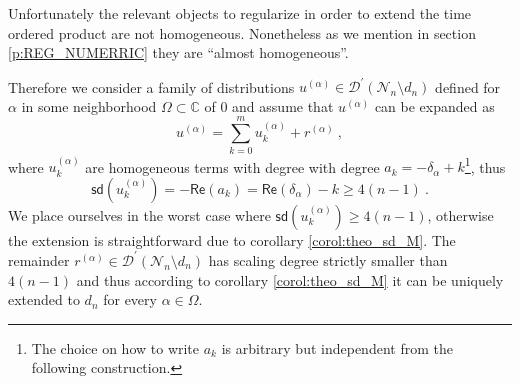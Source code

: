 \documentclass[11pt]{book}
\newcommand{\sd}{\mathsf{sd}}
\renewcommand{\Re}{\mathsf{Re}}
\newcommand{\Dcal}{\mathcal{D}}
\newcommand{\Ncal}{\mathcal{N}}
\newcommand{\Cbb}{\mathbb{C}}
\theoremstyle{break}
\begin{document}
Unfortunately the relevant objects to regularize in order to extend the time ordered product are not homogeneous. Nonetheless as we mention in section \ref{p:REG_NUMERRIC} they are ``almost homogeneous''. 


Therefore we consider a family of distributions $u^{(\alpha)} \in \Dcal^\prime(\Ncal_n\setminus d_n)$ defined for $\alpha$ in some neighborhood $\Omega \subset \Cbb$ of $0$ and assume that $u^{(\alpha)}$ can be expanded as
%
\begin{equation*}
u^{(\alpha)}  = \sum_{k=0}^m u^{(\alpha)}_k + r^{(\alpha)} \ ,
\end{equation*}
%
where $u^{(\alpha)}_k$ are homogeneous terms with degree with degree $a_k = - \delta_\alpha + k$\footnote{The choice on how to write $a_k$ is arbitrary but independent from the following construction.}, thus 
%
\begin{equation*}
\sd(u^{(\alpha)}_k) = - \Re(a_k)  =\Re\left(\delta_\alpha\right) - k \geq 4(n-1) \ .
\end{equation*}
%
We place ourselves in the worst case where $\sd(u^{(\alpha)}_k) \geq 4(n-1)$, otherwise the extension is straightforward due to corollary \ref{corol:theo_sd_M}. The remainder $r^{(\alpha)}\in \Dcal^\prime(\Ncal_n\setminus d_n)$ has scaling degree strictly smaller than $4(n-1)$ and thus according to corollary \ref{corol:theo_sd_M} it can be uniquely extended to $d_n$ for every $\alpha \in \Omega$.


\bigskip
\end{document}
